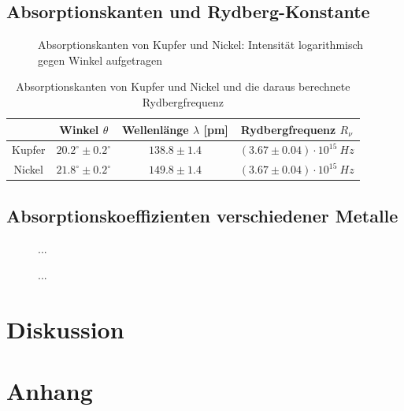 \documentclass[12pt,a4paper,titlepage,headinclude,bibtotoc]{scrartcl}
\begin{document}
\subsection{Absorptionskanten und Rydberg-Konstante}
\begin{figure}[!htb]
	\centering
	
	\caption{Absorptionskanten von Kupfer und Nickel: Intensität logarithmisch gegen Winkel aufgetragen}
\end{figure}
\begin{table}
	\centering
	\begin{tabular}{|c|c|c|c|}
		\hline
		& Winkel $\theta$ & Wellenlänge $\lambda$ [pm] & Rydbergfrequenz $R_\nu$\\
		\hline
		Kupfer & $20.2^\circ \pm 0.2^\circ$ & $138.8 \pm 1.4$ & $(3.67 \pm 0.04)\cdot 10^{15}~\si{Hz}$  \\
		Nickel & $21.8^\circ \pm 0.2^\circ$ & $149.8 \pm 1.4$ & $(3.67 \pm 0.04)\cdot 10^{15}~\si{Hz}$  \\
		\hline
	\end{tabular}
	\caption{Absorptionskanten von Kupfer und Nickel und die daraus berechnete Rydbergfrequenz}
\end{table}

\subsection{Absorptionskoeffizienten verschiedener Metalle}
\begin{figure}[!htb]
	\centering
	
	\caption{...}
\end{figure}

\begin{figure}[!htb]
	\centering
	
	\caption{...}
\end{figure}

\section{Diskussion}
\label{sec:diskussion}

\section{Anhang}



\end{document}
